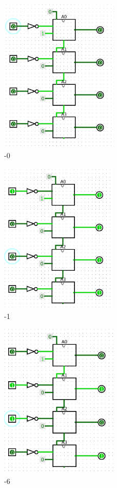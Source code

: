 \documentclass{book}
\theoremstyle{definition}
\theoremstyle{definition}
\begin{document}
\begin{figure}
\includegraphics[width=0.5\textwidth]{media/SysLogiques/inv0.png}
    \centering
    \caption{-0}
    \label{fig:inv0}
\end{figure}

\begin{figure}
\includegraphics[width=0.5\textwidth]{media/SysLogiques/inv1.png}
    \centering
    \caption{-1}
    \label{fig:inv1}
\end{figure}

\begin{figure}
\includegraphics[width=0.5\textwidth]{media/SysLogiques/inv6.png}
    \centering
    \caption{-6}
    \label{fig:inv6}
\end{figure}
\end{document}
